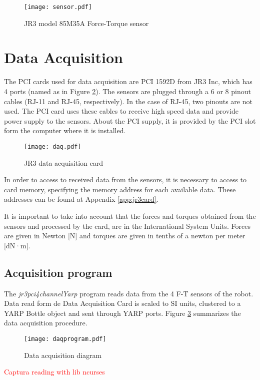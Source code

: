 \begin{figure}[!hbt]
\centering
\texttt{[image: sensor.pdf]}
\caption{JR3 model 85M35A Force-Torque sensor}
\label{fig:sensor}
\end{figure}

\section{Data Acquisition}
The PCI cards used for data acquisition are PCI 1592D from JR3 Inc, which has 4 ports (named as in Figure \ref{fig:daq}). The sensors are plugged through a 6 or 8 pinout cables (RJ-11 and RJ-45, respectively). In the case of RJ-45, two pinouts are not used. The PCI card uses these cables to receive high speed data and provide power supply to the sensors. About the PCI supply, it is provided by the PCI slot form the computer where it is installed.


\begin{figure}[!hbt]
\centering
\texttt{[image: daq.pdf]}
\caption{JR3 data acquisition card}
\label{fig:daq}
\end{figure}

In order to access to received data from the sensors, it is necessary to access to card memory, specifying the memory address for each available data. These addresses can be found at Appendix \ref{app:jr3card}.

It is important to take into account that the forces and torques obtained from the sensors and processed by the card, are in the International System Units. Forces are given in Newton [N] and torques are given in tenths of a newton per meter [dN·m].

\subsection{Acquisition program}
The \textit{jr3pci4channelYarp} program reads data from the 4 F-T sensors of the robot. Data read form de Data Acquisition Card is scaled to SI units, clustered to a YARP Bottle object and sent through YARP ports. Figure \ref{fig:daqprogram} summarizes the data acquisition procedure.

\begin{figure}[!hbt]
\centering
\texttt{[image: daqprogram.pdf]}
\caption{Data acquisition diagram}
\label{fig:daqprogram}
\end{figure}

\textcolor{red}{Captura reading with lib ncurses}

